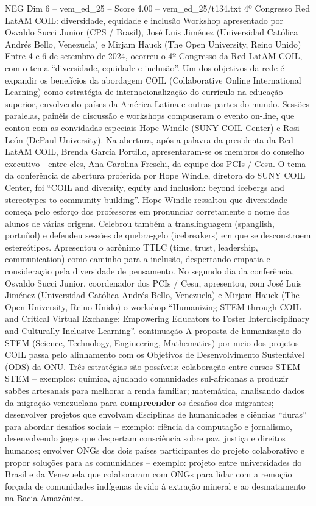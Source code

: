 \begin{textsample}{NEG Dim 6 – vem\_ed\_25 – Score 4.00 – vem\_ed\_25/t134.txt}  \label{ex:f6_neg_066}
4º Congresso Red LatAM COIL: diversidade, equidade e inclusão Workshop apresentado por Osvaldo Succi Junior (CPS / Brasil), José Luis Jiménez (Universidad Católica Andrés Bello, Venezuela) e Mirjam Hauck (The Open University, Reino Unido) Entre 4 e 6 de setembro de 2024, ocorreu o 4º Congresso da Red LatAM COIL, com o tema “diversidade, equidade e inclusão”.
Um dos objetivos da rede é expandir os benefícios da abordagem COIL (Collaborative Online International Learning) como estratégia de internacionalização do currículo na educação superior, envolvendo países da América Latina e outras partes do mundo.
Sessões paralelas, painéis de discussão e workshops compuseram o evento on-line, que contou com as convidadas especiais Hope Windle (SUNY COIL Center) e Rosi León (DePaul University).
Na abertura, após a palavra da presidenta da Red LatAM COIL, Brenda García Portillo, apresentaram-se os membros do conselho executivo - entre eles, Ana Carolina Freschi, da equipe dos PCIs / Cesu.
O tema da conferência de abertura proferida por Hope Windle, diretora do SUNY COIL Center, foi “COIL and diversity, equity and inclusion: beyond icebergs and stereotypes to community building”.
Hope Windle ressaltou que diversidade começa pelo esforço dos professores em pronunciar corretamente o nome dos alunos de várias origens.
Celebrou também a translinguagem (spanglish, portuñol) e defendeu sessões de quebra-gelo (icebreakers) em que se desconstroem estereótipos.
Apresentou o acrônimo TTLC (time, trust, leadership, communication) como caminho para a inclusão, despertando empatia e consideração pela diversidade de pensamento.
No segundo dia da conferência, Osvaldo Succi Junior, coordenador dos PCIs / Cesu, apresentou, com José Luis Jiménez (Universidad Católica Andrés Bello, Venezuela) e Mirjam Hauck (The Open University, Reino Unido) o workshop “Humanizing STEM through COIL and Critical Virtual Exchange: Empowering Educators to Foster Interdisciplinary and Culturally Inclusive Learning”. continuação A proposta de humanização do STEM (Science, Technology, Engineering, Mathematics) por meio dos projetos COIL passa pelo alinhamento com os Objetivos de Desenvolvimento Sustentável (ODS) da ONU.
Três estratégias são possíveis: colaboração entre cursos STEM-STEM – exemplos: química, ajudando comunidades sul-africanas a produzir sabões artesanais para melhorar a renda familiar; matemática, analisando dados da migração venezuelana para \textbf{compreender} os desafios dos migrantes; desenvolver projetos que envolvam disciplinas de humanidades e ciências “duras” para abordar desafios sociais – exemplo: ciência da computação e jornalismo, desenvolvendo jogos que despertam consciência sobre paz, justiça e direitos humanos; envolver ONGs dos dois países participantes do projeto colaborativo e propor soluções para as comunidades – exemplo: projeto entre universidades do Brasil e da Venezuela que colaboraram com ONGs para lidar com a remoção forçada de comunidades indígenas devido à extração mineral e ao desmatamento na Bacia Amazônica.

\end{textsample}
